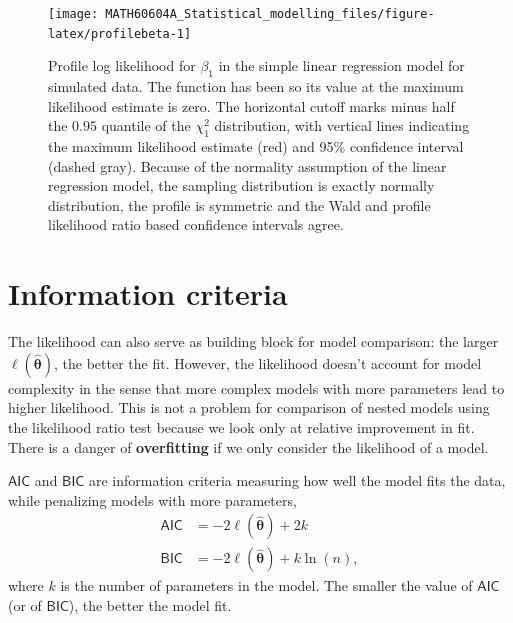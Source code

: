 \documentclass[
  11pt,
  letterpaper,
]{book}
\theoremstyle{definition}
\theoremstyle{definition}
\theoremstyle{definition}
\theoremstyle{definition}
\theoremstyle{remark}
\begin{document}
\begin{figure}

{\centering \texttt{[image: MATH60604A\_Statistical\_modelling\_files/figure-latex/profilebeta-1]} 

}

\caption{Profile log likelihood for $\beta_1$ in the simple linear regression model for simulated data. The function has been so its value at the maximum likelihood estimate is zero. The horizontal cutoff marks minus half the $0.95$ quantile of the $\chi^2_1$ distribution, with vertical lines indicating the maximum likelihood estimate (red) and 95\% confidence interval (dashed gray). Because of the normality assumption of the linear regression model, the sampling distribution is exactly normally distribution, the profile is symmetric and the Wald and profile likelihood ratio based confidence intervals agree.}\label{fig:profilebeta}
\end{figure}

\hypertarget{information-criteria}{%
\section{Information criteria}\label{information-criteria}}

The likelihood can also serve as building block for model comparison: the larger \(\ell(\boldsymbol{\widehat{\theta}})\), the better the fit. However, the likelihood doesn't account for model complexity in the sense that more complex models with more parameters lead to higher likelihood. This is not a problem for comparison of nested models using the likelihood ratio test because we look only at relative improvement in fit. There is a danger of \textbf{overfitting} if we only consider the likelihood of a model.

\(\mathsf{AIC}\) and \(\mathsf{BIC}\) are information criteria measuring how well the model fits the data, while penalizing models with more parameters,
\begin{align*}
\mathsf{AIC}&=-2\ell(\widehat{\boldsymbol{\theta}})+2k \\
\mathsf{BIC}&=-2\ell(\widehat{\boldsymbol{\theta}})+k\ln(n),
\end{align*}
where \(k\) is the number of parameters in the model. The smaller the value of \(\mathsf{AIC}\) (or of \(\mathsf{BIC}\)), the better the model fit.
\end{document}
